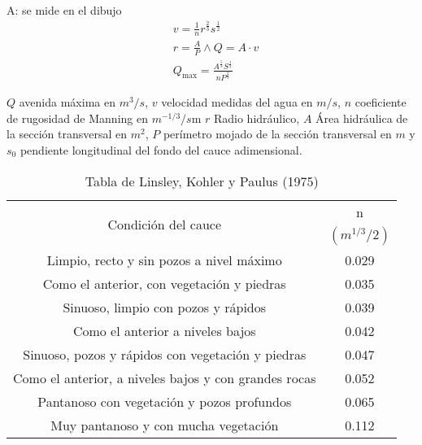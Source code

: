       A: se mide en el dibujo
      \begin{align}
          &v = \frac{1}{n}r^{\frac{2}{3}}s^{\frac{1}{2}}\\
          &r = \frac{A}{P}\land Q = A\cdot v\\
          &Q_{\max} =\frac{A^{\frac{5}{3}}S^{\frac{1}{2}}}{nP^{\frac{2}{3}}}
      \end{align}
      
      $Q$ avenida máxima en $m^3/s$, $v$ velocidad medidas del agua en $m/s$, $n$ coeficiente de rugosidad de Manning en $m^{-1/3}/s$m $r$ Radio hidráulico, $A$ Área hidráulica de la sección transversal en $m^2$, $P$ perímetro mojado de la sección transversal en $m$ y $s_0$ pendiente longitudinal del fondo del cauce adimensional.
      \begin{table}[h!]
          \begin{tabular}{@{}cc@{}}
          \toprule
          \multirow{2}{*}{Condición del cauce}                  & n             \\ \cmidrule(l){2-2} 
                                                                & $(m^{1/3}/2)$ \\ \cmidrule(r){1-1}
          Limpio, recto y sin pozos a nivel máximo              & 0.029         \\
          Como el anterior, con vegetación y piedras            & 0.035         \\
          Sinuoso, limpio con pozos y rápidos                   & 0.039         \\
          Como el anterior a niveles bajos                      & 0.042         \\
          Sinuoso, pozos y rápidos con vegetación y piedras     & 0.047         \\
          Como el anterior, a niveles bajos y con grandes rocas & 0.052         \\
          Pantanoso con vegetación y pozos profundos            & 0.065         \\
          Muy pantanoso y con mucha vegetación                  & 0.112         \\ \bottomrule
          \end{tabular}
          \caption{Tabla de Linsley, Kohler y Paulus (1975)}
          \label{tabta20}
          \end{table}
      
